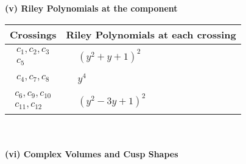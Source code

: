 \documentclass[1p]{elsarticle_modified}
\theoremstyle{definition}
\begin{document}
\newpage\renewcommand{\arraystretch}{1}
\flushleft \textbf{(v) Riley Polynomials at the component}\newline \\
\begin{tabular}{m{50pt}|m{274pt}}
Crossings & \hspace{64pt}Riley Polynomials at each crossing \\
\hline $$\begin{aligned}c_{1},c_{2},c_{3}\\c_{5}\end{aligned}$$&$\begin{aligned}
&(y^2+y+1)^2
\end{aligned}$\\
\hline $$\begin{aligned}c_{4},c_{7},c_{8}\end{aligned}$$&$\begin{aligned}
&y^4
\end{aligned}$\\
\hline $$\begin{aligned}c_{6},c_{9},c_{10}\\c_{11},c_{12}\end{aligned}$$&$\begin{aligned}
&(y^2-3 y+1)^2
\end{aligned}$\\
\hline
\end{tabular}\\~\\
\newpage\flushleft \textbf{(vi) Complex Volumes and Cusp Shapes}
\end{document}
